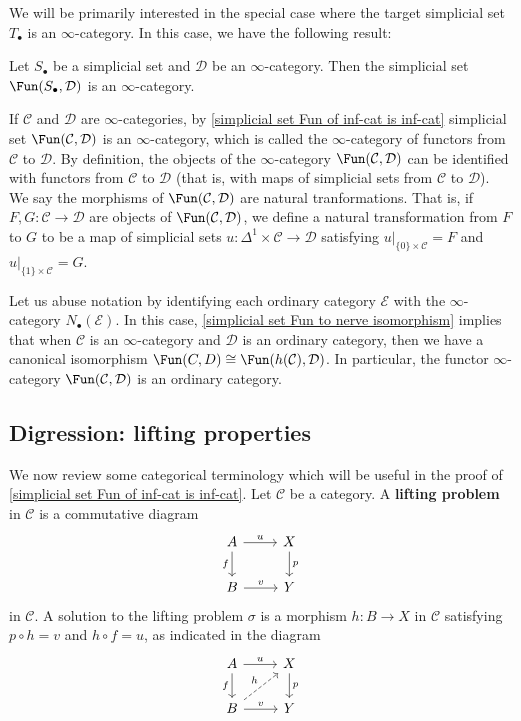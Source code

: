 We will be primarily interested in the special case where the target simplicial set $T_\bullet$ is an $\infty$-category. In this case, we have the following result:
\begin{theorem}\label{simplicial set Fun of inf-cat is inf-cat}
Let $S_\bullet$ be a simplicial set and $\mathcal{D}$ be an $\infty$-category. Then the simplicial set $\Fun(S_\bullet,\mathcal{D})$ is an $\infty$-category.
\end{theorem}
If $\mathcal{C}$ and $\mathcal{D}$ are $\infty$-categories, by \cref{simplicial set Fun of inf-cat is inf-cat} simplicial set $\Fun(\mathcal{C},\mathcal{D})$ is an $\infty$-category, which is called the $\infty$-category of functors from $\mathcal{C}$ to $\mathcal{D}$. By definition, the objects of the $\infty$-category $\Fun(\mathcal{C},\mathcal{D})$ can be identified with functors from $\mathcal{C}$ to $\mathcal{D}$ (that is, with maps of simplicial sets from $\mathcal{C}$ to $\mathcal{D}$). We say the morphisms of $\Fun(\mathcal{C},\mathcal{D})$ are natural tranformations. That is, if $F,G:\mathcal{C}\to\mathcal{D}$ are objects of $\Fun(\mathcal{C},\mathcal{D})$, we define a natural transformation from $F$ to $G$ to be a map of simplicial sets $u:\Delta^1\times\mathcal{C}\to\mathcal{D}$ satisfying $u|_{\{0\}\times\mathcal{C}}=F$ and $u|_{\{1\}\times\mathcal{C}}=G$.\par
Let us abuse notation by identifying each ordinary category $\mathcal{E}$ with the $\infty$-category $N_\bullet(\mathcal{E})$. In this case, \cref{simplicial set Fun to nerve isomorphism} implies that when $\mathcal{C}$ is an $\infty$-category and $\mathcal{D}$ is an ordinary category, then we have a canonical isomorphism $\Fun(C,D)\cong\Fun(h(\mathcal{C}),\mathcal{D})$. In particular, the functor $\infty$-category $\Fun(\mathcal{C},\mathcal{D})$ is an ordinary category.
\subsection{Digression: lifting properties}
We now review some categorical terminology which will be useful in the proof of \cref{simplicial set Fun of inf-cat is inf-cat}. Let $\mathcal{C}$ be a category. A \textbf{lifting problem} in $\mathcal{C}$ is a commutative diagram
\[\begin{tikzcd}
A\ar[r,"u"]\ar[d,swap,"f"]&X\ar[d,"p"]\\
B\ar[r,"v"]&Y
\end{tikzcd}\]
in $\mathcal{C}$. A solution to the lifting problem $\sigma$ is a morphism $h:B\to X$ in $\mathcal{C}$ satisfying $p\circ h=v$ and $h\circ f=u$, as indicated in the diagram
\[\begin{tikzcd}
A\ar[r,"u"]\ar[d,swap,"f"]&X\ar[d,"p"]\\
B\ar[r,"v"]\ar[ru,dashed,"h"]&Y
\end{tikzcd}\]

